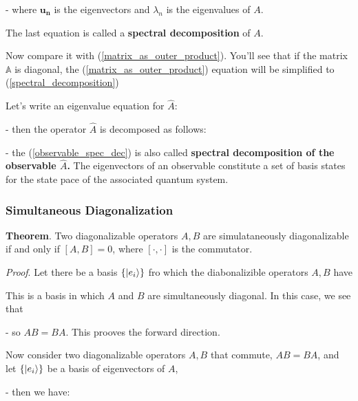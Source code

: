 \documentclass{article}
\begin{document}
- where $\bm{u_n}$ is the eigenvectors and $\lambda_n$ is the eigenvalues of $A$.

The last equation is called a \textbf{spectral decomposition} of $A$.

Now compare it with (\ref{matrix_as_outer_product}). You'll see that if the matrix $\mathbb{A}$ is diagonal, the (\ref{matrix_as_outer_product}) equation will be simplified to (\ref{spectral_decomposition})


Let's write an eigenvalue equation for $\hat{A}$:


- then the operator $\hat{A}$ is decomposed as follows:


- the (\ref{observable_spec_dec}) is also called \textbf{spectral decomposition of the observable $\hat{A}$.} The eigenvectors of an observable constitute a set of basis states for the state pace of the associated quantum system.


\subsubsection{Simultaneous Diagonalization}
\textbf{Theorem}. Two diagonalizable operators $A,B$ are simulataneously diagonalizable if and only if $[A,B] = 0$, where $[\cdot , \cdot]$ is the commutator.

\textit{Proof}. Let there be a basis $\lbrace \ket{e_i} \rbrace$ fro which the diabonalizible operators $A,B$ have


This is a basis in which $A$ and $B$ are simultaneously diagonal. In this case, we see that


- so $AB = BA$. This prooves the forward direction.


Now consider two diagonalizable operators $A,B$ that commute, $AB = BA$, and let $\lbrace \ket{e_i} \rbrace$ be a basis of eigenvectors of $A$,


- then we have:
\end{document}
